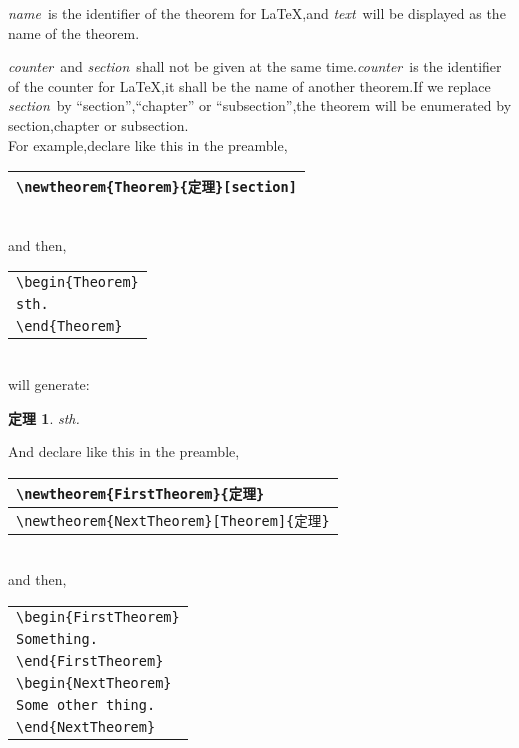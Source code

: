 \documentclass[a4paper]{report}
\newtheorem{Theorem}{定理}[section]
\newtheorem{FirstTheorem}{定理}
\newtheorem{NextTheorem}[FirstTheorem]{定理}
\begin{document}
\emph{name}\ is the identifier of the theorem for \LaTeX,and
\emph{text}\ will be displayed as the name of the theorem.

\emph{counter}\ and \emph{section}\ shall not be given at the same
time.\emph{counter}\ is the identifier of the counter for \LaTeX,it
shall be the name of another theorem.If we replace \emph{section}\
by ``section'',``chapter'' or ``subsection'',the theorem will be
enumerated by section,chapter or subsection.\\

For example,declare like this in the preamble,\\

\begin{tabular}{|l|}
\hline \verb|\newtheorem{Theorem}{定理}[section]|\\
\hline
\end{tabular}\\

and then,\\

\begin{tabular}{|l|}
\hline
\verb|\begin{Theorem}|\\
\verb|sth.|\\
\verb|\end{Theorem}|\\
\hline
\end{tabular}\\

will generate:\\

\begin{Theorem}
sth.
\end{Theorem}

And declare like this in the preamble,\\

\begin{tabular}{|l|}
\hline \verb|\newtheorem{FirstTheorem}{定理}|\\
\hline \verb|\newtheorem{NextTheorem}[Theorem]{定理}|\\
\hline
\end{tabular}\\

and then,\\

\begin{tabular}{|l|}
\hline
\verb|\begin{FirstTheorem}|\\
\verb|Something.|\\
\verb|\end{FirstTheorem}|\\
\verb|\begin{NextTheorem}|\\
\verb|Some other thing.|\\
\verb|\end{NextTheorem}|\\
\hline
\end{tabular}\\
\end{document}

